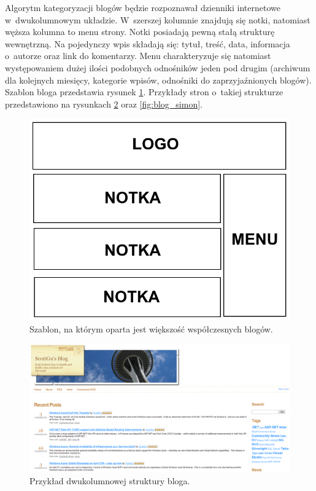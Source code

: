 \documentclass[a4paper,10pt]{article}
\begin{document}
Algorytm kategoryzacji blogów będzie rozpoznawał dzienniki internetowe w~dwukolumnowym układzie. W~szerszej kolumnie znajdują się notki, natomiast węższa kolumna to menu strony. Notki posiadają pewną stałą strukturę wewnętrzną. Na pojedynczy wpis składają się: tytuł, treść, data, informacja o~autorze oraz link do komentarzy. Menu charakteryzuje się natomiast występowaniem dużej ilości podobnych odnośników jeden pod drugim (archiwum dla kolejnych miesięcy, kategorie wpisów, odnośniki do zaprzyjaźnionych blogów). Szablon bloga przedstawia rysunek \ref{fig:blog_template}. Przykłady stron o~takiej strukturze przedstawiono na rysunkach \ref{fig:blog_scott} oraz \ref{fig:blog_simon}.

\begin{figure}[h!]
\centering
  \includegraphics[width=.5\textwidth]{blog_template.png}
  \caption{Szablon, na którym oparta jest większość współczesnych blogów.}
  \label{fig:blog_template}
\end{figure}

\begin{figure}[h!]
\centering
  \includegraphics[width=.9\textwidth]{blog_scott.png}
  \caption{Przykład dwukolumnowej struktury bloga.}
  \label{fig:blog_scott}
\end{figure}
\end{document}
